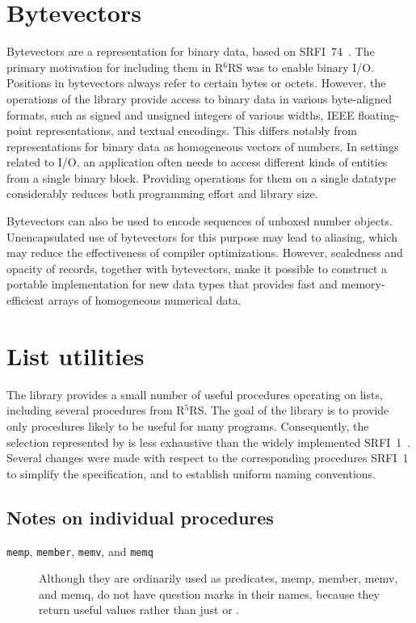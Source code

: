 \documentclass[twoside,twocolumn]{algol60}
\newcommand{\rn}[1]{R$^{#1}$RS}
\begin{document}
\chapter{Bytevectors}

Bytevectors are a representation for binary data, based on
SRFI~74~\cite{srfi74}.  The primary motivation for including them in
\rn{6} was to enable binary I/O.  Positions in bytevectors always
refer to certain bytes or octets.  However, the operations of the
 library provide access to binary data in
various byte-aligned formats, such as signed and unsigned integers of
various widths, IEEE floating-point representations, and textual
encodings.  This differs notably from representations for binary data
as homogeneous vectors of numbers.  In settings related to I/O, an
application often needs to access different kinds of entities from a
single binary block.  Providing operations for them on a single
datatype considerably reduces both programming effort and library
size.

Bytevectors can also be used to encode sequences of unboxed number objects.
Unencapsulated use of bytevectors for this purpose may lead
to aliasing, which may reduce the effectiveness of compiler
optimizations.  However, sealedness and
opacity of records, together with bytevectors, make it possible to
construct a portable implementation for new data types that
provides fast and memory-efficient arrays of homogeneous numerical
data.

\chapter{List utilities}

The  library provides a small number of useful
procedures operating on lists, including several procedures from
\rn{5}.  The goal of the library is to provide only procedures likely
to be useful for many programs.  Consequently, the selection
represented by  is less exhaustive than the widely
implemented SRFI~1~\cite{srfi1}.  Several changes were made with
respect to the corresponding procedures SRFI~1 to simplify the
specification, and to establish uniform naming conventions.

\section{Notes on individual procedures}

\begin{description}
\item[{\tt memp}, {\tt member}, {\tt memv}, and {\tt memq}]
Although they are ordinarily used as predicates, {\cf memp}, {\cf
  member}, {\cf memv}, and {\cf memq}, do not have question marks in
their names, because they return useful values rather than just
\schtrue{} or \schfalse{}.
\end{description}
\end{document}
